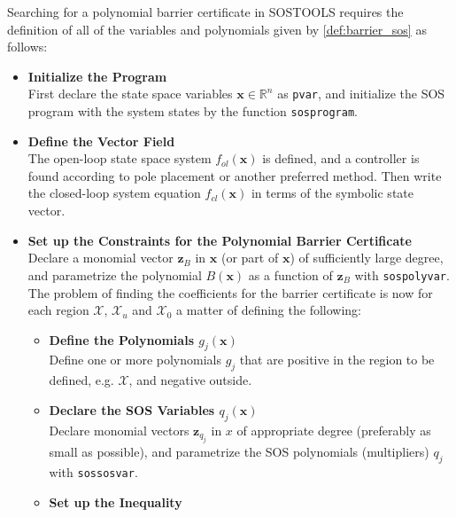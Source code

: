 Searching for a polynomial barrier certificate in SOSTOOLS requires the definition of all of the variables and polynomials given by \autoref{def:barrier_sos} as follows:
\vspace{-2mm}
\renewcommand{\labelitemii}{$\circ$}
\renewcommand{\labelitemiii}{$\bullet$}
\begin{itemize}
	\itemsep-0.7mm
	\item \textbf{Initialize the Program}\\
	First declare the state space variables $\mathbf{x}\in\mathbb{R}^n$ as \texttt{pvar}, and initialize the SOS program with the system states by the function \texttt{sosprogram}.
	\item \textbf{Define the Vector Field}\\
	The open-loop state space system $f_{ol}(\mathbf{x})$ is defined, and a controller is found according to pole placement or another preferred method. Then write the closed-loop system equation $f_{cl}(\mathbf{x})$ in terms of the symbolic state vector.
	\item \textbf{Set up the Constraints for the Polynomial Barrier Certificate}\\
	Declare a monomial vector $\mathbf{z}_B$ in $\mathbf{x}$ (or part of $\mathbf{x}$) of sufficiently large degree, and parametrize the polynomial $B(\mathbf{x})$ as a function of $\mathbf{z}_B$ with \texttt{sospolyvar}.  
	The problem of finding the coefficients for the barrier certificate is now for each region $\mathcal{X}$, $\mathcal{X}_u$ and $\mathcal{X}_0$ a matter of defining the following:
	\vspace*{-1mm}
	\begin{itemize}
		\item \textbf{Define the Polynomials $g_j(\mathbf{x})$}\\
		Define one or more polynomials $g_j$ that are positive in the region to be defined, e.g. $\mathcal{X}$, and negative outside. %
		\item \textbf{Declare the SOS Variables $q_j(\mathbf{x})$}\\
		Declare monomial vectors $\mathbf{z}_{q_j}$ in $x$ of appropriate degree (preferably as small as possible), %
		and parametrize the SOS polynomials (multipliers) $q_j$ with \texttt{sossosvar}.
		\item \textbf{Set up the Inequality}\\

\end{itemize}
\end{itemize}
